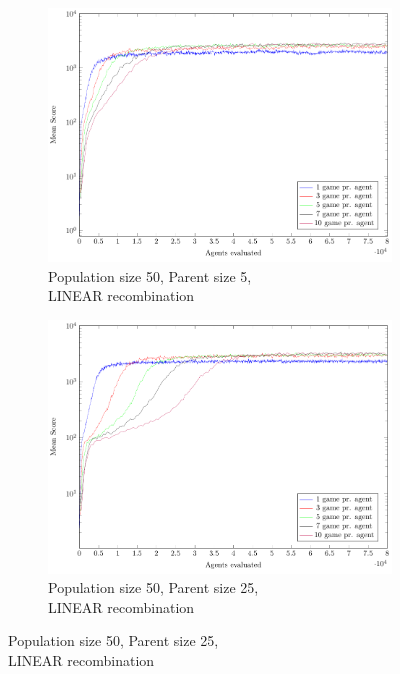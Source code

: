 \begin{figure}
\begin{subfigure}[b]{0.49\textwidth}
    \end{subfigure}
    \begin{subfigure}[b]{0.49\textwidth}
    	\centering
    	\caption{Population size 50, Parent size 5,\\LINEAR recombination}
        \includegraphics[width=\textwidth]{data/cma_population_offspring/50x_split/linear_l50_o5/mean/PlotFile.pdf}
    \end{subfigure}
    \begin{subfigure}[b]{0.49\textwidth}
    	\centering
    	\caption{Population size 50, Parent size 25,\\LINEAR recombination}
        \includegraphics[width=\textwidth]{data/cma_population_offspring/50x_split/linear_l50_o25/mean/PlotFile.pdf}

\end{subfigure}
\end{figure}

